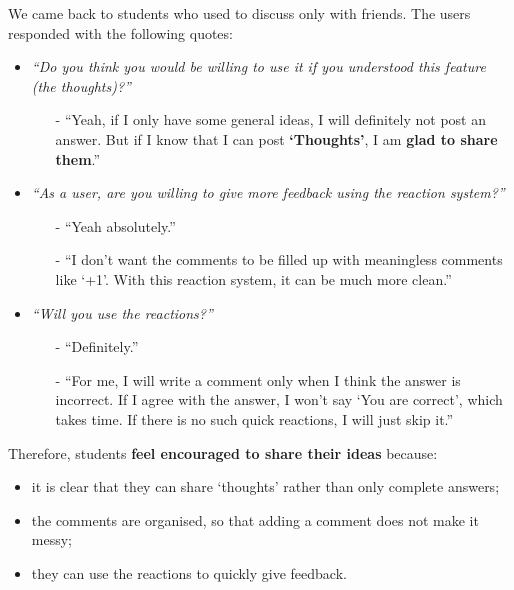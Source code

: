 \documentclass[a4paper]{article}
\begin{document}
    We came back to students who used to discuss only with friends.
    The users responded with the following quotes:
    \begin{itemize}
        \item \textit{``Do you think you would be willing to use it if you understood this feature (the thoughts)?''}
        \begin{itemize}
            \item[-] ``Yeah, if I only have some general ideas, I will definitely not post an answer.
            But if I know that I can post \textbf{`Thoughts'}, I am \textbf{glad to share them}.''
        \end{itemize}

        \item
        \textit{``As a user, are you willing to give more feedback using the reaction system?''}
        \begin{itemize}
            \item[-] ``Yeah absolutely.''
            \item[-] ``I don’t want the comments to be filled up with meaningless comments like `+1'.
            With this reaction system, it can be much more clean.''
        \end{itemize}

        \item \textit{``Will you use the reactions?''}
        \begin{itemize}
            \item[-] ``Definitely.''
            \item[-] ``For me, I will write a comment only when I think the answer is incorrect.
            If I agree with the answer, I won't say `You are correct', which takes time.
            If there is no such quick reactions, I will just skip it.''
        \end{itemize}
    \end{itemize}

    Therefore, students \textbf{feel encouraged to share their ideas} because:
    \begin{itemize}
        \item it is clear that they can share `thoughts' rather than only complete answers;
        \item the comments are organised, so that adding a comment does not make it messy;
        \item they can use the reactions to quickly give feedback.
    \end{itemize}
\end{document}
